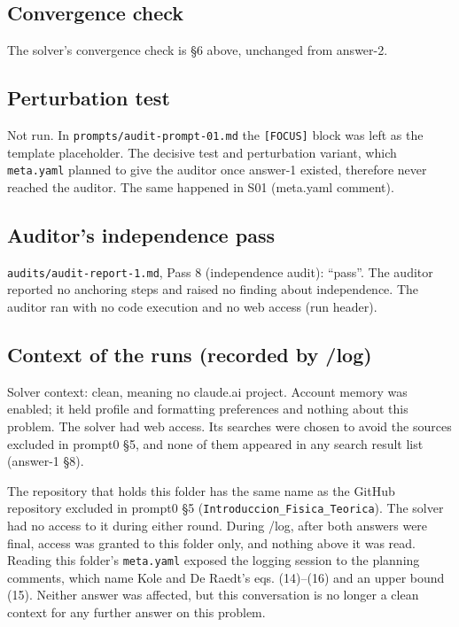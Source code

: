 \documentclass[11pt,a4paper]{article}
\begin{document}
\subsection{Convergence check}
The solver's convergence check is §6 above, unchanged from answer-2.
\hypertarget{perturbation-test}{%
\subsection{Perturbation test}\label{perturbation-test}}

Not run. In \texttt{prompts/audit-prompt-01.md} the \texttt{[FOCUS]} block was left as the template placeholder. The decisive test and perturbation variant, which \texttt{meta.yaml} planned to give the auditor once answer-1 existed, therefore never reached the auditor. The same happened in S01 (meta.yaml comment).

\hypertarget{auditors-independence-pass}{%
\subsection{Auditor's independence pass}\label{auditors-independence-pass}}

\texttt{audits/audit-report-1.md}, Pass 8 (independence audit): ``pass''. The auditor reported no anchoring steps and raised no finding about independence. The auditor ran with no code execution and no web access (run header).

\hypertarget{context-of-the-runs-recorded-by-log}{%
\subsection{Context of the runs (recorded by /log)}\label{context-of-the-runs-recorded-by-log}}

Solver context: clean, meaning no claude.ai project. Account memory was enabled; it held profile and formatting preferences and nothing about this problem. The solver had web access. Its searches were chosen to avoid the sources excluded in prompt0 §5, and none of them appeared in any search result list (answer-1 §8).

The repository that holds this folder has the same name as the GitHub repository excluded in prompt0 §5 (\texttt{Introduccion\_Fisica\_Teorica}). The solver had no access to it during either round. During /log, after both answers were final, access was granted to this folder only, and nothing above it was read. Reading this folder's \texttt{meta.yaml} exposed the logging session to the planning comments, which name Kole and De Raedt's eqs. (14)--(16) and an upper bound (15). Neither answer was affected, but this conversation is no longer a clean context for any further answer on this problem.
\end{document}
